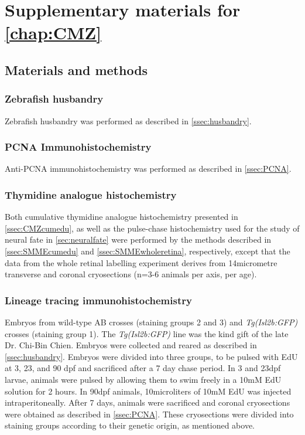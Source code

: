 \chapter{Supplementary materials for \autoref{chap:CMZ}}
\section{Materials and methods}
\subsection{Zebrafish husbandry}
Zebrafish husbandry was performed as described in \autoref{ssec:husbandry}.
\subsection{PCNA Immunohistochemistry}
Anti-PCNA immunohistochemistry was performed as described in \autoref{ssec:PCNA}.
\subsection{Thymidine analogue histochemistry}
Both cumulative thymidine analogue histochemistry presented in \autoref{ssec:CMZcumedu}, as well as the pulse-chase histochemistry used for the study of neural fate in \autoref{sec:neuralfate} were performed by the methods described in \autoref{ssec:SMMEcumedu} and \autoref{ssec:SMMEwholeretina}, respectively, except that the data from the whole retinal labelling experiment derives from 14\si{micro}{metre} transverse and coronal cryosections (n=3-6 animals per axis, per age). 

\subsection{Lineage tracing immunohistochemistry}
Embryos from wild-type AB crosses (staining groups 2 and 3) and \textit{Tg(Isl2b:GFP)} crosses (staining group 1). The \textit{Tg(Isl2b:GFP)} line was the kind gift of the late Dr. Chi-Bin Chien. Embryos were collected and reared as described in \autoref{ssec:husbandry}. Embryos were divided into three groups, to be pulsed with EdU at 3, 23, and 90 dpf and sacrificed after a 7 day chase period. In 3 and 23dpf larvae, animals were pulsed by allowing them to swim freely in a 10mM EdU solution for 2 hours. In 90dpf animals, 10\si{micro}{liters} of 10mM EdU was injected intraperitoneally. After 7 days, animals were sacrificed and coronal cryosections were obtained as described in \autoref{ssec:PCNA}. These cryosections were divided into staining groups according to their genetic origin, as mentioned above.

